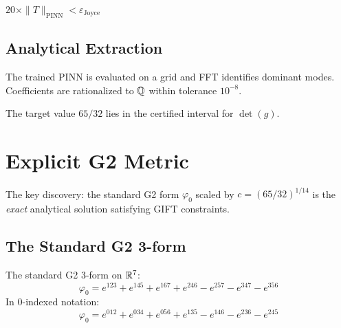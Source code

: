 \begin{theorem}[20x Margin]\label{thm:margin_20x}
    $20 \times \|T\|_{\text{PINN}} < \varepsilon_{\text{Joyce}}$
\end{theorem}

\section{Analytical Extraction}

\begin{definition}\label{def:fourier_coeffs}
    The trained PINN is evaluated on a grid and FFT identifies dominant modes.
    Coefficients are rationalized to $\mathbb{Q}$ within tolerance $10^{-8}$.
\end{definition}

\begin{theorem}\label{thm:target_interval}
    The target value $65/32$ lies in the certified interval for $\det(g)$.
\end{theorem}

\chapter{Explicit G2 Metric}\label{chap:explicit_metric}

The key discovery: the standard G2 form $\varphi_0$ scaled by $c = (65/32)^{1/14}$
is the \emph{exact} analytical solution satisfying GIFT constraints.

\section{The Standard G2 3-form}

\begin{definition}\label{def:phi0_explicit}
    \leanok
    The standard G2 3-form on $\mathbb{R}^7$:
    \[
        \varphi_0 = e^{123} + e^{145} + e^{167} + e^{246} - e^{257} - e^{347} - e^{356}
    \]
    In 0-indexed notation:
    \[
        \varphi_0 = e^{012} + e^{034} + e^{056} + e^{135} - e^{146} - e^{236} - e^{245}
    \]
\end{definition}

